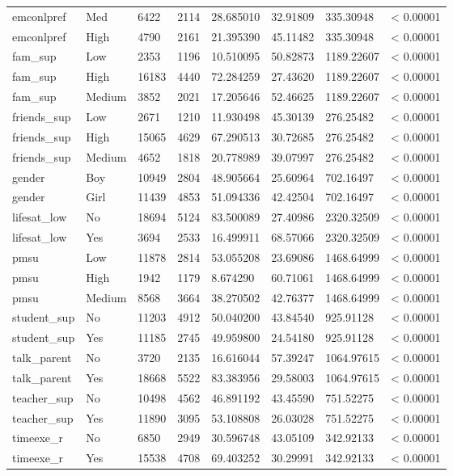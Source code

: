 \begin{table}
\begin{tabular}{llllllll}
emconlpref & Med & 6422 & 2114 & 28.685010 & 32.91809 & 335.30948 & < 0.00001 \\
emconlpref & High & 4790 & 2161 & 21.395390 & 45.11482 & 335.30948 & < 0.00001 \\
fam_sup & Low & 2353 & 1196 & 10.510095 & 50.82873 & 1189.22607 & < 0.00001 \\
fam_sup & High & 16183 & 4440 & 72.284259 & 27.43620 & 1189.22607 & < 0.00001 \\
fam_sup & Medium & 3852 & 2021 & 17.205646 & 52.46625 & 1189.22607 & < 0.00001 \\
friends_sup & Low & 2671 & 1210 & 11.930498 & 45.30139 & 276.25482 & < 0.00001 \\
friends_sup & High & 15065 & 4629 & 67.290513 & 30.72685 & 276.25482 & < 0.00001 \\
friends_sup & Medium & 4652 & 1818 & 20.778989 & 39.07997 & 276.25482 & < 0.00001 \\
gender & Boy & 10949 & 2804 & 48.905664 & 25.60964 & 702.16497 & < 0.00001 \\
gender & Girl & 11439 & 4853 & 51.094336 & 42.42504 & 702.16497 & < 0.00001 \\
lifesat_low & No & 18694 & 5124 & 83.500089 & 27.40986 & 2320.32509 & < 0.00001 \\
lifesat_low & Yes & 3694 & 2533 & 16.499911 & 68.57066 & 2320.32509 & < 0.00001 \\
pmsu & Low & 11878 & 2814 & 53.055208 & 23.69086 & 1468.64999 & < 0.00001 \\
pmsu & High & 1942 & 1179 & 8.674290 & 60.71061 & 1468.64999 & < 0.00001 \\
pmsu & Medium & 8568 & 3664 & 38.270502 & 42.76377 & 1468.64999 & < 0.00001 \\
student_sup & No & 11203 & 4912 & 50.040200 & 43.84540 & 925.91128 & < 0.00001 \\
student_sup & Yes & 11185 & 2745 & 49.959800 & 24.54180 & 925.91128 & < 0.00001 \\
talk_parent & No & 3720 & 2135 & 16.616044 & 57.39247 & 1064.97615 & < 0.00001 \\
talk_parent & Yes & 18668 & 5522 & 83.383956 & 29.58003 & 1064.97615 & < 0.00001 \\
teacher_sup & No & 10498 & 4562 & 46.891192 & 43.45590 & 751.52275 & < 0.00001 \\
teacher_sup & Yes & 11890 & 3095 & 53.108808 & 26.03028 & 751.52275 & < 0.00001 \\
timeexe_r & No & 6850 & 2949 & 30.596748 & 43.05109 & 342.92133 & < 0.00001 \\
timeexe_r & Yes & 15538 & 4708 & 69.403252 & 30.29991 & 342.92133 & < 0.00001 \\
\end{tabular}
\end{table}
